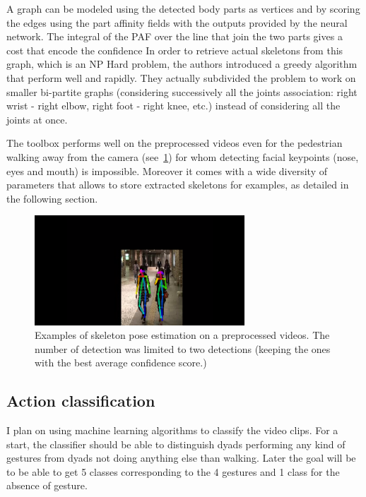 \documentclass[12pt,a4paper,twoside]{article}
\begin{document}
A graph can be modeled using the detected body parts as vertices and by scoring the edges using the part affinity fields with the outputs provided by the neural network. The integral of the PAF over the line that join the two parts gives a cost that encode the confidence In order to retrieve actual skeletons from this graph, which is an NP Hard problem, the authors  introduced a greedy algorithm that perform well and rapidly. They actually subdivided the problem to work on smaller bi-partite graphs (considering successively all the joints association: right wrist - right elbow, right foot - right knee, etc.) instead of considering all the joints at once.

The toolbox performs well on the preprocessed videos even for the pedestrian walking away from the camera (see~\ref{fig:skeleton}) for whom detecting facial keypoints (nose, eyes and mouth) is impossible. Moreover it comes with a wide diversity of parameters that allows to store extracted skeletons for examples, as detailed in the following section.

\begin{figure}
    \centering
        \includegraphics[width=0.7\textwidth]{images/dyad_rendered}
    \caption{Examples of skeleton pose estimation on a preprocessed videos. The number of detection was limited to two detections (keeping the ones with the best average confidence score.)}
    \label{fig:skeleton}
\end{figure}

\subsection{Action classification}
I plan on using machine learning algorithms to classify the video clips. For a start, the classifier should be able to distinguish dyads performing any kind of gestures from dyads not doing anything else than walking. Later the goal will be to be able to get 5 classes corresponding to the 4 gestures and 1 class for the absence of gesture.
\end{document}
